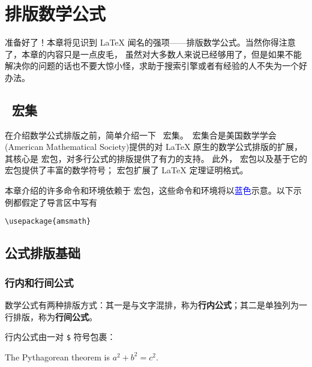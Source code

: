 \chapter{排版数学公式}\label{chap:math}

\begin{intro}
准备好了！本章将见识到 \LaTeX{} 闻名的强项——排版数学公式。当然你得注意了，本章的内容只是一点皮毛，
虽然对大多数人来说已经够用了，但是如果不能解决你的问题的话也不要大惊小怪，求助于搜索引擎或者有经验的人不失为一个好办法。
\end{intro}
\DeclareRobustCommand*\amscmd[1]{\textcolor{blue}{\cmd{#1}}}
\DeclareRobustCommand*\amsenv[1]{\textcolor{blue}{\env{#1}}}

\section{\AmS\ 宏集}\label{sec:ams-bundle}

在介绍数学公式排版之前，简单介绍一下 \AmS\ 宏集。\AmS\ 宏集合是美国数学学会(American Mathematical Society)提供的对
\LaTeX{} 原生的数学公式排版的扩展，其核心是  宏包，对多行公式的排版提供了有力的支持。
此外， 宏包以及基于它的  宏包提供了丰富的数学符号； 宏包扩展了 \LaTeX{} 定理证明格式。

本章介绍的许多命令和环境依赖于  宏包，这些命令和环境将以\textcolor{blue}{蓝色}示意。以下示例都假定了导言区中写有
\begin{verbatim}
\usepackage{amsmath}
\end{verbatim}

\section{公式排版基础}\label{sec:math-basics}

\subsection{行内和行间公式}\label{subsec:math-inline-display}

数学公式有两种排版方式：其一是与文字混排，称为\textbf{行内公式}；其二是单独列为一行排版，称为\textbf{行间公式}。

行内公式由一对 \texttt\$ 符号包裹：
\begin{example}
The Pythagorean theorem is
$a^2 + b^2 = c^2$.
\end{example}

